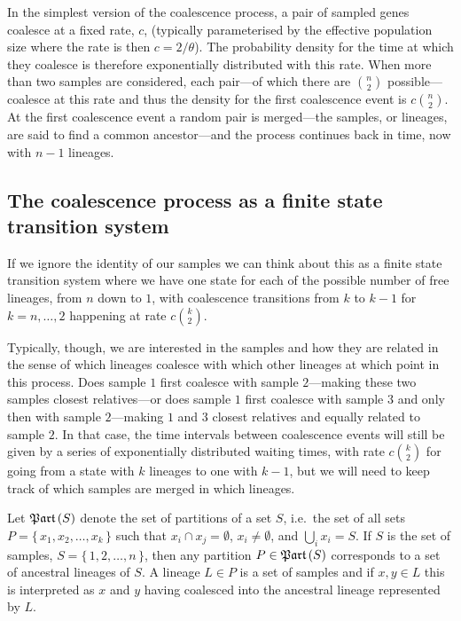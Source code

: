 In the simplest version of the coalescence process, a pair of sampled genes coalesce at a fixed rate, $c$, (typically parameterised by the effective population size where the rate is then $c=2/\theta$). The probability density for the time at which they coalesce is therefore exponentially distributed with this rate. When more than two samples are considered, each pair---of which there are $n \choose 2$ possible---coalesce at this rate and thus the density for the first coalescence event is $c{n \choose 2}$. At the first coalescence event a random pair is merged---the samples, or lineages, are said to find a common ancestor---and the process continues back in time, now with $n-1$ lineages.

\subsection{The coalescence process as a finite state transition system}

If we ignore the identity of our samples we can think about this as a finite state transition system where we have one state for each of the possible number of free lineages, from $n$ down to $1$, with coalescence transitions from $k$ to $k-1$ for $k=n,\ldots,2$ happening at rate $c{k \choose 2}$.

Typically, though, we are interested in the samples and how they are related in the sense of which lineages coalesce with which other lineages at which point in this process.  Does sample $1$ first coalesce with sample $2$---making these two samples closest relatives---or does sample $1$ first coalesce with sample $3$ and only then with sample $2$---making $1$ and $3$ closest relatives and equally related to sample $2$. In that case, the time intervals between coalescence events will still be given by a series of exponentially distributed waiting times, with rate $c{k \choose 2}$ for going from a state with $k$ lineages to one with $k-1$, but we will need to keep track of which samples are merged in which lineages.

Let $\mathfrak{Part}\left(S\right)$ denote the set of partitions of a set $S$, i.e.\ the set of all sets $P=\{\,x_1,x_2,\ldots,x_k\,\}$ such that $x_i\cap x_j=\emptyset$, $x_i\neq\emptyset$, and $\bigcup_i x_i = S$. If $S$ is the set of samples, $S=\{\,1,2,\ldots,n\,\}$, then any partition $P\in\mathfrak{Part}\left(S\right)$ corresponds to a set of ancestral lineages of $S$. A lineage $L\in P$ is a set of samples and if $x,y\in L$ this is interpreted as $x$ and $y$ having coalesced into the ancestral lineage represented by $L$.

